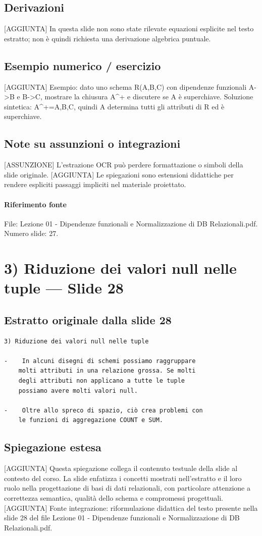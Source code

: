 \documentclass[11pt]{article}
\begin{document}
\subsection*{Derivazioni}
[AGGIUNTA] In questa slide non sono state rilevate equazioni esplicite nel testo estratto; non è quindi richiesta una derivazione algebrica puntuale.
\subsection*{Esempio numerico / esercizio}
[AGGIUNTA] Esempio: dato uno schema R(A,B,C) con dipendenze funzionali A->B e B->C, mostrare la chiusura A^+ e discutere se A è superchiave. Soluzione sintetica: A^+={A,B,C}, quindi A determina tutti gli attributi di R ed è superchiave.
\subsection*{Note su assunzioni o integrazioni}
[ASSUNZIONE] L'estrazione OCR può perdere formattazione o simboli della slide originale.
[AGGIUNTA] Le spiegazioni sono estensioni didattiche per rendere espliciti passaggi impliciti nel materiale proiettato.
\paragraph{Riferimento fonte} File: Lezione 01 - Dipendenze funzionali e Normalizzazione di DB Relazionali.pdf. Numero slide: 27.
\section{3) Riduzione dei valori null nelle tuple --- Slide 28}
\subsection*{Estratto originale dalla slide 28}
\begin{lstlisting}
3) Riduzione dei valori null nelle tuple

-    In alcuni disegni di schemi possiamo raggruppare
    molti attributi in una relazione grossa. Se molti
    degli attributi non applicano a tutte le tuple
    possiamo avere molti valori null.

-    Oltre allo spreco di spazio, ciò crea problemi con
    le funzioni di aggregazione COUNT e SUM.
\end{lstlisting}
\subsection*{Spiegazione estesa}
[AGGIUNTA] Questa spiegazione collega il contenuto testuale della slide al contesto del corso. La slide enfatizza i concetti mostrati nell'estratto e il loro ruolo nella progettazione di basi di dati relazionali, con particolare attenzione a correttezza semantica, qualità dello schema e compromessi progettuali.
[AGGIUNTA] Fonte integrazione: riformulazione didattica del testo presente nella slide 28 del file Lezione 01 - Dipendenze funzionali e Normalizzazione di DB Relazionali.pdf.
\end{document}

